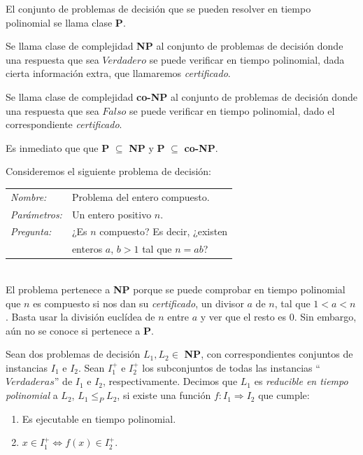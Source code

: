 \begin{definition}
	El conjunto de problemas de decisión que se pueden resolver en tiempo polinomial se llama clase \textbf{P}.
\end{definition}

\begin{definition}
	Se llama clase de complejidad \textbf{NP} al conjunto de problemas de decisión donde una respuesta que sea $Verdadero$ se puede verificar en tiempo polinomial, dada cierta información extra, que llamaremos \textit{certificado}.
	\label{def:NP}
\end{definition}

\begin{definition}
	Se llama clase de complejidad \textbf{co-NP} al conjunto de problemas de decisión donde una respuesta que sea $Falso$ se puede verificar en tiempo polinomial, dado el correspondiente \textit{certificado}.
\end{definition}

Es inmediato que  que \textbf{P} $\subseteq$ \textbf{NP} y \textbf{P} $\subseteq$ \textbf{co-NP}.

\begin{example}
	Consideremos el siguiente problema de decisión:
	
		\begin{tabular}{|ll}
		\textit{Nombre:} & Problema del entero compuesto. \\
		\textit{Parámetros:} & Un entero positivo $n$. \\
		\textit{Pregunta:} & ¿Es $n$ compuesto? Es decir, ¿existen \\
			&  enteros $a$, $b > 1$ tal que $n=ab$? \\
	\end{tabular}
	\\
	
	El problema pertenece a \textbf{NP} porque se puede comprobar en tiempo polinomial que $n$ es compuesto si nos dan su \textit{certificado}, un divisor $a$ de $n$, tal que $1 < a < n$. Basta usar la división euclídea de $n$ entre $a$ y ver que el resto es $0$. Sin embargo, aún no se conoce si pertenece a \textbf{P}.
\end{example}


\hfil

\begin{definition}
	Sean dos problemas de decisión $L_1, L_2 \in $ \textbf{NP}, con correspondientes conjuntos de instancias $I_1$ e $I_2$. Sean $I_1^+$ e $I_2^+$ los subconjuntos de todas las instancias ``$Verdaderas$'' de $I_1$ e $I_2$, respectivamente. Decimos que $L_1$ es \textit{reducible en tiempo polinomial} a $L_2$, $L_1 \leq_P L_2$, si existe una función $f:I_1 \Rightarrow I_2$ que cumple:
	
	\begin{enumerate}
		\item Es ejecutable en tiempo polinomial.
		\item $x \in I_1^+  \Leftrightarrow  f(x) \in I_2^+ $.
	\end{enumerate}
\end{definition}

